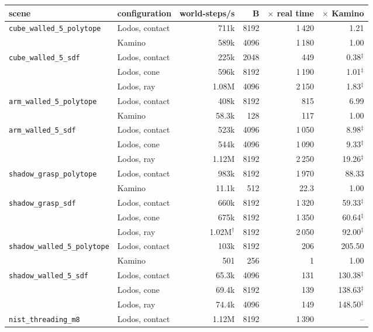 \begin{longtable}{@{}llrrrr@{}}
\toprule
scene & configuration & world-steps/s & B & $\times$ real time & $\times$ Kamino \\
\midrule
\endhead
\texttt{cube\_walled\_5\_polytope} & Lodos, contact & 711k & 8192 & 1\,420 & 1.21 \\*
 & Kamino & 589k & 4096 & 1\,180 & 1.00 \\
\addlinespace
\texttt{cube\_walled\_5\_sdf} & Lodos, contact & 225k & 2048 & 449 & 0.38$^\ddagger$ \\*
 & Lodos, cone & 596k & 8192 & 1\,190 & 1.01$^\ddagger$ \\*
 & Lodos, ray & 1.08M & 4096 & 2\,150 & 1.83$^\ddagger$ \\
\addlinespace
\texttt{arm\_walled\_5\_polytope} & Lodos, contact & 408k & 8192 & 815 & 6.99 \\*
 & Kamino & 58.3k & 128 & 117 & 1.00 \\
\addlinespace
\texttt{arm\_walled\_5\_sdf} & Lodos, contact & 523k & 4096 & 1\,050 & 8.98$^\ddagger$ \\*
 & Lodos, cone & 544k & 4096 & 1\,090 & 9.33$^\ddagger$ \\*
 & Lodos, ray & 1.12M & 8192 & 2\,250 & 19.26$^\ddagger$ \\
\addlinespace
\texttt{shadow\_grasp\_polytope} & Lodos, contact & 983k & 8192 & 1\,970 & 88.33 \\*
 & Kamino & 11.1k & 512 & 22.3 & 1.00 \\
\addlinespace
\texttt{shadow\_grasp\_sdf} & Lodos, contact & 660k & 8192 & 1\,320 & 59.33$^\ddagger$ \\*
 & Lodos, cone & 675k & 8192 & 1\,350 & 60.64$^\ddagger$ \\*
 & Lodos, ray & 1.02M$^\dagger$ & 8192 & 2\,050 & 92.00$^\ddagger$ \\
\addlinespace
\texttt{shadow\_walled\_5\_polytope} & Lodos, contact & 103k & 8192 & 206 & 205.50 \\*
 & Kamino & 501 & 256 & 1 & 1.00 \\
\addlinespace
\texttt{shadow\_walled\_5\_sdf} & Lodos, contact & 65.3k & 4096 & 131 & 130.38$^\ddagger$ \\*
 & Lodos, cone & 69.4k & 8192 & 139 & 138.63$^\ddagger$ \\*
 & Lodos, ray & 74.4k & 4096 & 149 & 148.50$^\ddagger$ \\
\addlinespace
\texttt{nist\_threading\_m8} & Lodos, contact & 1.12M & 8192 & 1\,390 & -- \\*

\end{longtable}
